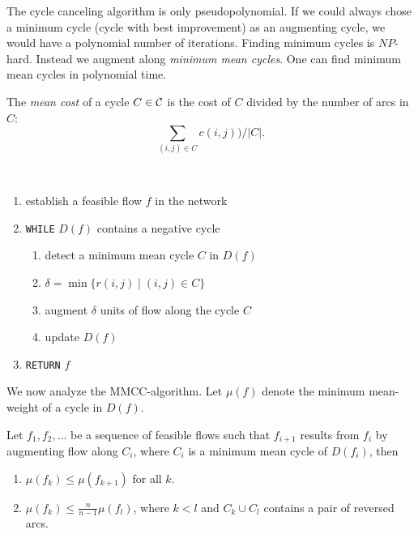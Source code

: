   The cycle canceling algorithm is only pseudopolynomial. If we could
  always chose a minimum cycle (cycle with best improvement) as an
  augmenting cycle, we would have a polynomial number of
  iterations. Finding minimum cycles is $NP$-hard. Instead we augment
  along \emph{minimum mean cycles}. One can find minimum mean cycles
  in polynomial time.  

  The \emph{mean cost} of a cycle $C \in \mathcal{C}$ is the cost of $C$
  divided by the number of arcs in $C$:
  \begin{displaymath}
    \sum_{(i,j) \in C} c{(i,j)})  / |C|.
  \end{displaymath}
  

  \begin{algorithm}
    \label{alg:2}
    ~\\
    \begin{enumerate}
    \item establish a feasible flow $f$ in the network
    \item {\tt WHILE} $D(f)$ contains a negative cycle
      \begin{enumerate}
      \item  detect a minimum mean cycle $C$ in $D(f)$ 
      \item   $\delta=\min\{r{(i,j)} \mid (i,j) \in C\}$
      \item   augment $\delta$ units of flow along the cycle $C$
      \item   update $D(f)$ 
      \end{enumerate}
    \item {\tt RETURN} $f$
    \end{enumerate}
  \end{algorithm}



  We now analyze the MMCC-algorithm. Let $\mu(f)$ denote the minimum
  mean-weight of a cycle in $D(f)$. 
  
  \begin{lemma}
    \label{lem:8}
    Let $f_1,f_2,\ldots$ be a sequence of feasible flows such that
    $f_{i+1}$ results from $f_i$ by augmenting flow along $C_i$, where
    $C_i$ is a minimum mean cycle of $D(f_i)$, then
    \begin{enumerate}
    \item \label{item:5} $\mu(f_k)\leq\mu(f_{k+1})$ for all $k$.
    \item \label{item:6} $\mu(f_k) \leq \frac{n}{n-1} \mu(f_l)$, where $k<l$
      and $C_k \cup C_l$ contains a pair of reversed arcs.
    \end{enumerate}
  \end{lemma}



